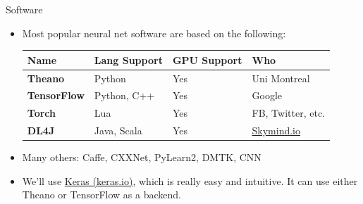 \documentclass[xcolor=pdftex,x11names,table,hyperref]{beamer}
\begin{document}
\begin{frame}{Software}
\begin{itemize}
	\item Most popular neural net software are based on the following: \\[1.0em]
\hspace*{-2.0em}%
\begin{tabular}{llll}
	\bf Name & \bf Lang Support & \bf GPU Support & \bf Who \\
	\hline
	\bf Theano & Python & Yes & Uni Montreal \\
	\bf TensorFlow & Python, C++ & Yes & Google \\
	\bf Torch & Lua & Yes & FB, Twitter, etc. \\
	\bf DL4J & Java, Scala & Yes & \href{http://skymind.io}{Skymind.io} \\
\end{tabular}
\vspace*{1.0em}
\pause
\item Many others: Caffe, CXXNet, PyLearn2, DMTK, CNN
\pause
\item We'll use \href{http://keras.io}{Keras (keras.io)}, which is really easy and intuitive.  It can use either Theano or TensorFlow as a backend.
\end{itemize}
\end{frame}

\end{document}
